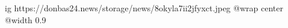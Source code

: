  
 
 
 
 

\ifcmt
  ig https://donbas24.news/storage/news/8okyla7ii2jfyxct.jpeg
  @wrap center
  @width 0.9
\fi
